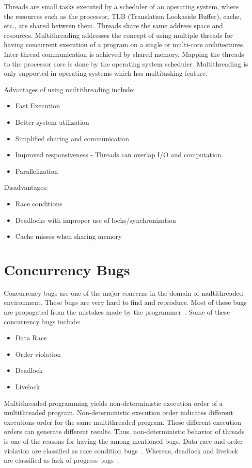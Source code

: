 Threads are small tasks executed by a scheduler of an operating system, where the resources such as the processor, TLB (Translation Lookaside Buffer), cache, etc., are shared between them. 
Threads share the same address space and resources. 
Multithreading addresses the concept of using multiple threads for having concurrent execution of a program on a single or multi-core architectures. 
Inter-thread communication is achieved by shared memory. 
Mapping the threads to the processor core is done by the operating system scheduler. 
Multithreading is only supported in operating systems which has multitasking feature. 

Advantages of using multithreading include: 
\begin{itemize}
\item	Fast Execution
\item	Better system utilization
\item	Simplified sharing  and communication
\item 	Improved responsiveness - Threads can overlap I/O and computation.
\item	Parallelization
\end{itemize}

Disadvantages:
\begin{itemize}
\item	Race conditions
\item	Deadlocks with improper use of locks/synchronization
\item	Cache misses when sharing memory
\end{itemize}

\section{Concurrency Bugs \label{con_bugs}}

Concurrency bugs are one of the major concerns in the domain of multithreaded environment. 
These bugs are very hard to find and reproduce. 
Most of these bugs are propagated from the mistakes made by the programmer~\citep{lopez2017study}. 
Some of these concurrency bugs include:
\begin{itemize}
\item	Data Race
\item 	Order violation
\item	Deadlock
\item	Livelock
\end{itemize}

Multithreaded programming yields non-deterministic execution order of a multithreaded program. 
Non-deterministic execution order indicates different executions order for the same multithreaded program. 
These different execution orders can generate different results. 
Thus, non-deterministic behavior of threads is one of the reasons for having the among mentioned bugs. 
Data race and order violation are classified as race condition bugs~\citep{lopez2017study}. 
Whereas, deadlock and livelock are classified as lack of progress bugs~\citep{lopez2017study}. 

